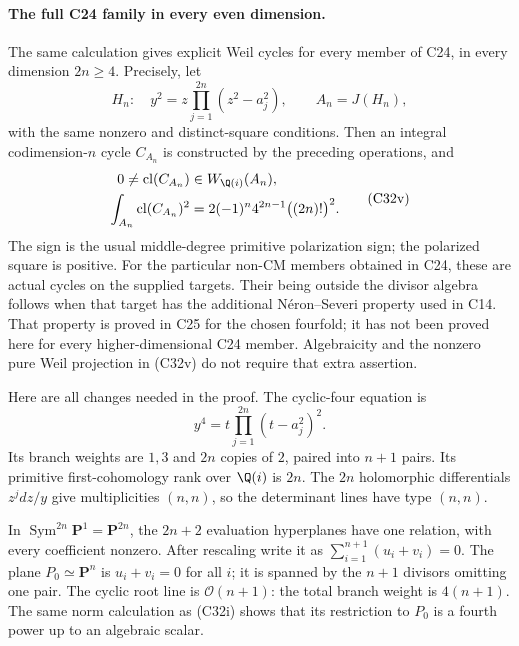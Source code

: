 \paragraph{The full C24 family in every even dimension.}
The same calculation gives explicit Weil cycles for
every member of C24, in every dimension $2n\geq4$.
Precisely, let
\[
 H_n:\quad y^2=z\prod_{j=1}^{2n}(z^2-a_j^2),
 \qquad A_n=J(H_n),
                                                        \tag{C32u}
\]
with the same nonzero and distinct-square conditions.
Then an integral codimension-$n$ cycle $C_{A_n}$
is constructed by the preceding operations, and
\[
 \begin{split}
 0\ne\operatorname{cl}(C_{A_n})&\in W_{\Q(i)}(A_n),\\
 \int_{A_n}\operatorname{cl}(C_{A_n})^2
       &=2(-1)^n4^{2n-1}\bigl((2n)!\bigr)^2.
 \end{split}
                                                        \tag{C32v}
\]
The sign is the usual middle-degree primitive
polarization sign; the polarized square is positive.
For the particular non-CM members obtained in C24,
these are actual cycles on the supplied targets.
Their being outside the divisor algebra follows
when that target has the additional N\'eron--Severi
property used in C14.  That property is proved in
C25 for the chosen fourfold; it has not been
proved here for every higher-dimensional C24
member.  Algebraicity and the nonzero pure Weil
projection in (C32v) do not require that extra
assertion.

Here are all changes needed in the proof.  The
cyclic-four equation is
\[
            y^4=t\prod_{j=1}^{2n}(t-a_j^2)^2.
\]
Its branch weights are $1,3$ and $2n$ copies of
$2$, paired into $n+1$ pairs.  Its primitive
first-cohomology rank over $\Q(i)$ is $2n$.
The $2n$ holomorphic differentials $z^jdz/y$
give multiplicities $(n,n)$, so the determinant
lines have type $(n,n)$.

In $\operatorname{Sym}^{2n}\mathbf P^1
=\mathbf P^{2n}$, the $2n+2$ evaluation
hyperplanes have one relation, with every
coefficient nonzero.  After rescaling write
it as $\sum_{i=1}^{n+1}(u_i+v_i)=0$.
The plane $P_0\simeq\mathbf P^n$ is
$u_i+v_i=0$ for all $i$; it is spanned by
the $n+1$ divisors omitting one pair.  The
cyclic root line is $\mathcal O(n+1)$:
the total branch weight is $4(n+1)$.
The same norm calculation as (C32i) shows
that its restriction to $P_0$ is a fourth
power up to an algebraic scalar.

